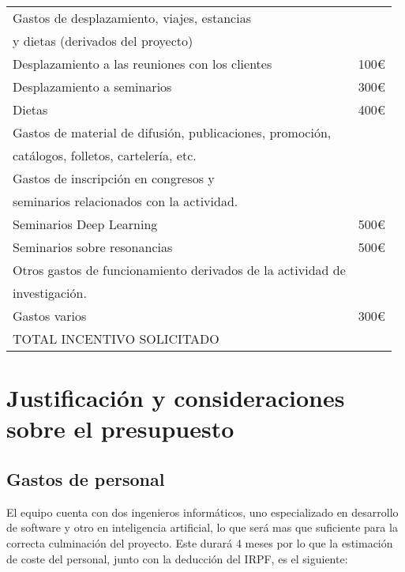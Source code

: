 \documentclass[a4paper,12pt,oneside]{article}
\begin{document}
\begin{table}[H]
\begin{tabular}{|l|c|}
		\cellcolor[gray]{0.8}Gastos de desplazamiento, viajes, estancias    \\ 
		\cellcolor[gray]{0.8}y dietas (derivados del proyecto) &  \\ \hline
		Desplazamiento a las reuniones con los clientes & 100\euro \\ \hline
		Desplazamiento a seminarios & 300\euro \\ \hline
		Dietas &  400\euro \\ \hline
		\cellcolor[gray]{0.8}Gastos de material de difusión, publicaciones, promoción,   \\ 
		\cellcolor[gray]{0.8}catálogos, folletos, cartelería, etc. &  \\ \hline
		\cellcolor[gray]{0.8}Gastos de inscripción en congresos y \\
		\cellcolor[gray]{0.8}seminarios relacionados con la actividad. &  \\ \hline
		Seminarios Deep Learning &  500\euro \\ \hline
		Seminarios sobre resonancias & 500\euro  \\ \hline
		\cellcolor[gray]{0.8}Otros gastos de funcionamiento derivados de la actividad de \\
		i\cellcolor[gray]{0.8}nvestigación. &  \\ \hline
		Gastos varios & 300\euro \\ \hline
		\cellcolor{red}TOTAL INCENTIVO SOLICITADO & \\ \bottomrule
		\end{tabular}
	\caption{}
	\label{nombre_etiqueta}
\end{table}

\section*{Justificación y consideraciones sobre el presupuesto}

\subsection*{Gastos de personal}

El equipo cuenta con dos ingenieros informáticos, uno especializado en desarrollo de software y otro en inteligencia artificial, lo que será mas que suficiente para la correcta culminación del proyecto. Este durará 4 meses por lo que la estimación de coste del personal, junto con la deducción del IRPF, es el siguiente: \\
\end{document}

